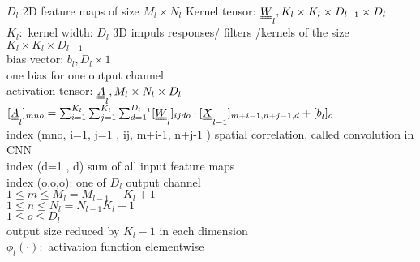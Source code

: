 $ D_l   $ 2D feature maps of size $  M_l \times N_l $
\textbullet Kernel tensor: $ \W_l , K_l \times K_l \times D_{l-1 } \times D_l  $\\
$ K_l:  $ kernel width:
$ D_l  $ 3D impuls responses/ filters /kernels of the size $  K_l \times K_l \times D_{l-1} $\\
\textbullet bias vector: $  b_l , D_l \times 1  $ \\
one bias for one output channel\\
\textbullet activation tensor: $  \A_l , M_l \times N_l \times D_l  $\\
$ [\A _l ] _{mno} = \sum_{i=1 }^{K_l } \sum_{j=1}^{K_l} \sum_{d=1 }^{D_{l-1}} [\W_l ] _{ijdo} \cdot [\X_{l-1}]_{m+i-1 , n+j-1,d} + [\b_l ]_o$ \\
index (mno, i=1, j=1 , ij, m+i-1, n+j-1 ) spatial correlation, called convolution in CNN \\
index (d=1 , d) sum of all input feature maps\\
index (o,o,o): one of $ D_l  $ output channel\\
$  1 \leq m \leq M_l = M_{l-1 } - K_l + 1  $\\
$  1 \leq n \leq N_l = N_{l-1 } K_l +1  $\\
$  1 \leq o \leq D_l $ \\
 output size reduced by $  K_l -1  $ in each dimension \\
\textbullet $  \phi_l (\cdot):  $ activation function elementwise \\
